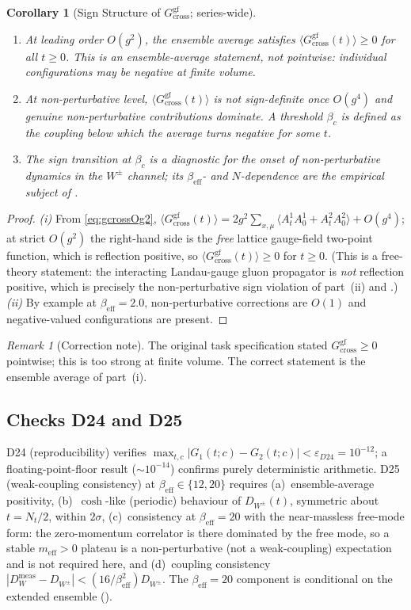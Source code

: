 \documentclass[11pt,a4paper]{article}
\theoremstyle{plain}
\newtheorem{corollary}{Corollary}
\theoremstyle{definition}
\theoremstyle{remark}
\newtheorem*{remark}{Remark}
\newcommand{\Gcrossgf}{G_{\mathrm{cross}}^{\mathrm{gf}}}
\newcommand{\DW}{D_{W^{\pm}}}
\newcommand{\be}{\beta_{\mathrm{eff}}}
\newcommand{\bc}{\beta_{c}}
\newcommand{\Nt}{N_{t}}
\begin{document}
\setcounter{corollary}{5}
\begin{corollary}[Sign Structure of $\Gcrossgf$; series-wide]
\hfill
\begin{enumerate}[label=(\roman*)]
\item At leading order $O(g^2)$, the ensemble average satisfies
$\langle\Gcrossgf(t)\rangle\ge0$ for all $t\ge0$. This is an
ensemble-average statement, not pointwise: individual configurations may
be negative at finite volume.
\item At non-perturbative level, $\langle\Gcrossgf(t)\rangle$ is not
sign-definite once $O(g^4)$ and genuine non-perturbative contributions
dominate. A threshold $\bc$ is defined as the coupling below which the
average turns negative for some $t$.
\item The sign transition at $\bc$ is a diagnostic for the onset of
non-perturbative dynamics in the $W^{\pm}$ channel; its $\be$- and
$N$-dependence are the empirical subject of .
\end{enumerate}
\end{corollary}

\begin{proof}
\textit{(i)} From \eqref{eq:gcrossOg2},
$\langle\Gcrossgf(t)\rangle=2g^2\sum_{x,\mu}\langle
A^1_tA^1_0+A^2_tA^2_0\rangle+O(g^4)$; at strict $O(g^2)$ the right-hand
side is the \emph{free} lattice gauge-field two-point function, which is
reflection positive, so $\langle\Gcrossgf(t)\rangle\ge0$ for $t\ge0$. (This
is a free-theory statement: the interacting Landau-gauge gluon propagator
is \emph{not} reflection positive, which is precisely the non-perturbative
sign violation of part~(ii) and .)
\textit{(ii)} By example at $\be=2.0$, non-perturbative corrections are
$O(1)$ and negative-valued configurations are present.
\end{proof}

\begin{remark}[Correction note]
The original task specification stated $\Gcrossgf\ge0$ pointwise; this is
too strong at finite volume. The correct statement is the ensemble
average of part~(i).
\end{remark}

\subsection{Checks D24 and D25}
\label{ssec:D24D25}

D24 (reproducibility) verifies
$\max_{t,c}|G_1(t;c)-G_2(t;c)|<\varepsilon_{D24}=10^{-12}$; a
floating-point-floor result ($\sim10^{-14}$) confirms purely
deterministic arithmetic. D25 (weak-coupling consistency) at
$\be\in\{12,20\}$ requires (a)~ensemble-average positivity, (b)~$\cosh$-like
(periodic) behaviour of $\DW(t)$, symmetric about $t=\Nt/2$, within
$2\sigma$, (c)~consistency at $\be=20$ with the near-massless free-mode
form: the zero-momentum correlator is there dominated by the free mode, so
a stable $m_{\mathrm{eff}}>0$ plateau is a non-perturbative (not a
weak-coupling) expectation and is not required here, and (d)~coupling
consistency $|D^{\mathrm{meas}}_{W}-\DW|<
(16/\be^2)\DW$. The $\be=20$ component is conditional on the extended
ensemble ().
\end{document}
